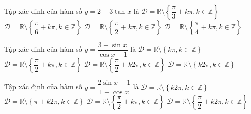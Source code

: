 \begin{ex}%
	Tập xác định của hàm số $y=2+3\tan  x$ là
	\choice 
		{$\mathscr{D}=\mathbb{R}\setminus\left\{\dfrac{\pi}{3}+k\pi ,k\in\mathbb{Z}\right\}$} 
		{$\mathscr{D}=\mathbb{R}\setminus\left\{\dfrac{\pi}{6}+k\pi ,k\in\mathbb{Z}\right\}$} 
		 {\True $\mathscr{D}=\mathbb{R}\setminus\left\{\dfrac{\pi}{2}+k\pi ,k\in\mathbb{Z}\right\}$}
		{$\mathscr{D}=\mathbb{R}\setminus\left\{\dfrac{\pi}{4}+k\pi ,k\in\mathbb{Z}\right\}$} 
\end{ex}

\begin{ex}%
	Tập xác định của hàm số $y=\dfrac{3+\sin  x}{\cos x-1}$ là
	\choice 
		{$\mathscr{D}=\mathbb{R}\setminus\left\{k\pi ,k\in\mathbb{Z}\right\}$} 
		{$\mathscr{D}=\mathbb{R}\setminus\left\{\dfrac{\pi}{2}+ k\pi  ,k\in\mathbb{Z}\right\}$}
		 {$\mathscr{D}=\mathbb{R}\setminus\left\{ \dfrac{\pi}{2}+k2\pi ,k\in\mathbb{Z}\right\}$}
		{\True  $\mathscr{D}=\mathbb{R}\setminus\left\{ k2\pi ,k\in\mathbb{Z}\right\}$}
\end{ex}

\begin{ex}%
	Tập xác  định của hàm số $y=\dfrac{2\sin x+1}{1-\cos x}$ là
	\choice 
		{\True $\mathscr{D}=\mathbb{R}\setminus\left\{k2\pi  ,k\in\mathbb{Z}\right\}$}
		 {$\mathscr{D}=\mathbb{R}\setminus\left\{\pi +k2\pi ,k\in\mathbb{Z}\right\}$}
		{$\mathscr{D}=\mathbb{R}\setminus\left\{\dfrac{\pi}{2}+k\pi ,k\in\mathbb{Z}\right\}$} 
		{$\mathscr{D}=\mathbb{R}\setminus\left\{\dfrac{\pi}{2}+k2\pi  ,k\in\mathbb{Z}\right\}$}
\end{ex}

